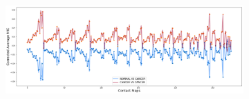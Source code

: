 \documentclass[a4,center,fleqn]{NAR}
\begin{document}
\begin{figure}
    \centering
    \begin{subfigure}[b]{\textwidth}
        \includegraphics[width=\textwidth]{figures/contact_maps_correlations_cancer_vs_normal.png}
    \caption{}
    \label{fig:contact_map_correlations_all}
    \end{subfigure}


\end{figure}
\end{document}
